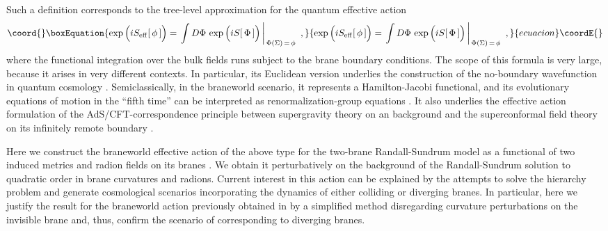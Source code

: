 \documentclass[a4paper,preprint,nofootinbib,
                 showpacs,preprintnumbers,amsmath,amssymb]{revtex4}
\begin{document}
Such a definition corresponds to the tree-level approximation for 
the quantum effective action 
    \begin{equation}\coord{}\boxEquation{ 
    \exp\Big(iS_{\rm eff}[\,\phi\,]\Big)= 
    \left.\int D\Phi \,\exp\Big(iS[\,\Phi\,]\Big)\, 
    \right|_{\,\Phi(\Sigma)\,=\,\phi}\,\, ,         \label{00.2} 
    }{ 
    \exp\Big(iS_{\rm eff}[\,\phi\,]\Big)= 
    \left.\int D\Phi \,\exp\Big(iS[\,\Phi\,]\Big)\, 
    \right|_{\,\Phi(\Sigma)\,=\,\phi}\,\, ,         }{ecuacion}\coordE{}\end{equation} 
where the functional integration over the bulk fields runs subject to 
the brane boundary conditions. The scope of this formula is very 
large, because it arises in very different contexts. In 
particular, its Euclidean version \coordHE{} 
underlies the construction of the no-boundary wavefunction in 
quantum cosmology \cite{HH}. Semiclassically, in the braneworld 
scenario, it represents a Hamilton-Jacobi functional, and its 
evolutionary equations of motion in the ``fifth time'' \coordHE{} can be 
interpreted as renormalization-group equations \cite{Verlinde}. 
It also underlies the effective action formulation of the 
AdS/CFT-correspondence principle between supergravity theory 
on an \coordHE{} background and the superconformal field 
theory on its infinitely remote boundary 
\cite{AdS/CFT,GKR,HHR1,HHR2,SkendSol}. 
 
Here we construct the braneworld effective action of the above 
type for the two-brane Randall-Sundrum model as a functional of 
two induced metrics \coordHE{} and radion fields 
\coordHE{} on its branes \myHighlight{$\Sigma_\pm$}\coordHE{}. We obtain it 
perturbatively on the background of the Randall-Sundrum solution 
to quadratic order in brane curvatures \coordHE{} and 
radions. Current interest in this action can be explained by the 
attempts to solve the hierarchy problem and generate 
cosmological scenarios incorporating the dynamics of either 
colliding \cite{DvTyeSh,Ekpyr,brantibr,cycle} or diverging 
\cite{brane} branes. In particular, here we justify the result for 
the braneworld action previously obtained in \cite{brane} by 
a simplified method disregarding curvature perturbations on the 
invisible brane and, thus, confirm the scenario of \cite{brane}  
corresponding to diverging branes. 
 
\end{document}
